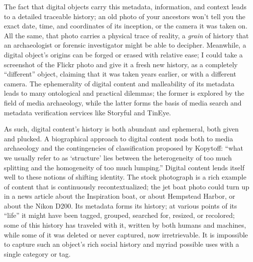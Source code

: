 The fact that digital objects carry this metadata, information, and context leads to a detailed traceable history; an old photo of your ancestors won't tell you the exact date, time, and coordinates of its inception, or the camera it was taken on. All the same, that photo carries a physical trace of reality, a \emph{grain} of history that an archaeologist or forensic investigator might be able to decipher. Meanwhile, a digital object's origins can be forged or erased with relative ease; I could take a screenshot of the Flickr photo and give it a fresh new history, as a completely ``different'' object, claiming that it was taken years earlier, or with a different camera. The ephemerality of digital content and malleability of its metadata leads to many ontological and practical dilemmas; the former is explored by the field of media archaeology, while the latter forms the basis of media search and metadata verification services like Storyful and TinEye.

As such, digital content's history is both abundant and ephemeral, both given and plucked. A biographical approach to digital content nods both to media archaeology and the contingencies of classification proposed by Kopytoff: ``what we usually refer to as `structure' lies between the heterogeneity of too much splitting and the homogeneity of too much lumping.''\autocite{kopytoff} Digital content lends itself well to these notions of shifting identity. The stock photograph is a rich example of content that is continuously recontextualized; the jet boat photo could turn up in a news article about the Inspiration boat, or about Hempstead Harbor, or about the Nikon D200. Its metadata forms its history; at various points of its ``life'' it might have been tagged, grouped, searched for, resized, or recolored; some of this history has traveled with it, written by both humans and machines, while some of it was deleted or never captured, now irretrievable. It is impossible to capture such an object's rich social history and myriad possible uses with a single category or tag.

